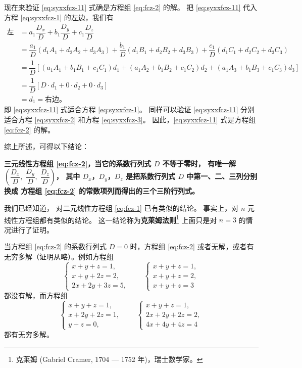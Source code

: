 现在来验证 \eqref{eq:syxxfcz-11} 式确是方程组 \eqref{eq:fcz-2} 的解。
把 \eqref{eq:syxxfcz-11} 代入方程 \eqref{eq:syxxfcz-1} 的左边，我们有
\begin{align*}
    \text{左边} &= a_1\dfrac{D_x}{D} + b_1\dfrac{D_y}{D} + c_1\dfrac{D_z}{D} \\
        &= \dfrac{a_1}{D}(d_1A_1 + d_2A_2 + d_3A_3)
            + \dfrac{b_1}{D}(d_1B_1 + d_2B_2 + d_3B_3)
            + \dfrac{c_1}{D}(d_1C_1 + d_2C_2 + d_3C_3) \\
        &= \dfrac{1}{D}[(a_1A_1 + b_1B_1 + c_1C_1)d_1
                        + (a_1A_2 + b_1B_2 + c_1C_2)d_2
                        + (a_1A_3 + b_1B_3 + c_1C_3)d_3] \\
        &= \dfrac{1}{D}[D \cdot d_1 + 0 \cdot d_2 + 0 \cdot d_3] \\
        &= d_1 = \text{右边。}
\end{align*}
即 \eqref{eq:syxxfcz-11} 式适合方程 \eqref{eq:syxxfcz-1}。
同样可以验证 \eqref{eq:syxxfcz-11} 分别适合方程 \eqref{eq:syxxfcz-2} 和方程 \eqref{eq:syxxfcz-3}。
因此，\eqref{eq:syxxfcz-11} 式是方程组 \eqref{eq:fcz-2} 的解。

综上所述，可得以下结论：

\textbf{三元线性方程组 \eqref{eq:fcz-2}，当它的系数行列式 $D$ 不等于零时，
有唯一解 $\left( \dfrac{D_x}{D},\; \dfrac{D_y}{D},\; \dfrac{D_z}{D} \right)$，
其中 $D_x$，$D_y$，$D_z$ 是把系数行列式 $D$ 中第一、二、三列分别换成
方程组 \eqref{eq:fcz-2} 的常数项列而得出的三个三阶行列式。}

我们已经知道， 对二元线性方程组 \eqref{eq:fcz-1} 已有类似的结论。
事实上，对 $n$ 元线性方程组都有类似的结论。
这一结论称为\textbf{克莱姆法则}\footnote{克莱姆 (Gabriel Cramer, 1704 — 1752 年)，瑞士数学家。}
上面只是对 $n = 3$ 的情况进行了证明。

当方程组 \eqref{eq:fcz-2} 的系数行列式 $D = 0$ 时，方程组 \eqref{eq:fcz-2}
或者无解，或者有无穷多解（证明从略）。例如方程组
$$
\begin{cases}
    x + y + z = 1, \\
    x + y + 2z = 2, \\
    2x + 2y + 3z = 5,
\end{cases} \qquad
\begin{cases}
    x + y + z = 1, \\
    x + y + z = 2, \\
    x + y + z = 3
\end{cases}
$$
都没有解，而方程组
$$
\begin{cases}
    x + y + z = 1, \\
    x + 2y + 2z = 1, \\
    y + z = 0,
\end{cases} \qquad
\begin{cases}
    x + y + z = 1, \\
    2x + 2y + 2z = 2, \\
    4x + 4y + 4z = 4
\end{cases}
$$
都有无穷多解。

